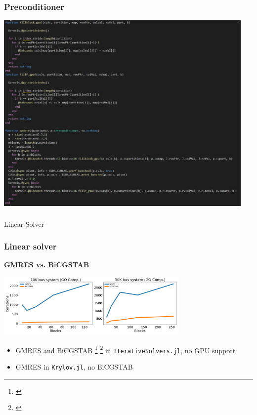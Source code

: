 \begin{frame}
  \frametitle{Preconditioner}
  \includegraphics[width=0.95\textwidth]{figures/preconditioner}
\end{frame}

\begin{frame}
  \frametitle{}
  \centering
  {\Huge Linear Solver}
\end{frame}

\begin{frame}
  \frametitle{Linear solver}
  {\bf GMRES vs. BiCGSTAB}
  \begin{center}
   \includegraphics[width=0.7\textwidth]{figures/gmresbicgstab.png}
  \end{center}
  \begin{itemize}
    \item GMRES and BiCGSTAB \footnote{\cite{bicgstabVorst}} \footnote{\cite{sleijpen1993bicgstab}} in \lstinline{IterativeSolvers.jl}, no GPU support 
    \item GMRES in \lstinline{Krylov.jl}, no BiCGSTAB 
  \end{itemize}
\end{frame}


